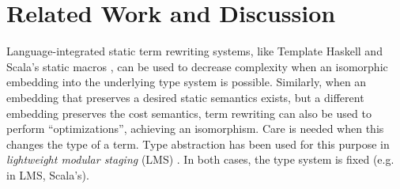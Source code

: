 \documentclass[10pt,preprint]{sigplanconf}
\begin{document}
\section{Related Work and Discussion}\label{prior-work}
Language-integrated static term rewriting systems, like Template Haskell \cite{SheardPeytonJones:Haskell-02} and Scala's static macros \cite{ScalaMacros2013}, can be used to decrease complexity when an isomorphic embedding into the underlying type system is possible. %
Similarly, when an embedding that preserves a desired static semantics exists, but a different  embedding preserves the cost semantics, term rewriting  can also be used to perform ``optimizations'', achieving an isomorphism. Care is needed when this changes the type of a term. Type abstraction has been used for  this purpose in \emph{lightweight modular staging} (LMS) \cite{Rompf:2012:LMS}. In both cases, the type system is fixed (e.g. in LMS, Scala's).
\end{document}
